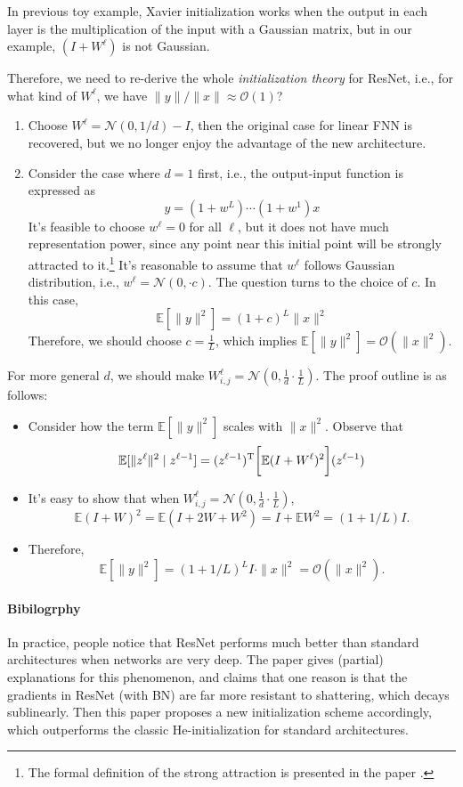 \begin{example}
\begin{enumerate}
In previous toy example, Xavier initialization works when the output in each layer is the multiplication of the input with a Gaussian matrix, but in our example, 
$(I+W^{\ell})$ is not Gaussian.
\end{enumerate}
Therefore, we need to re-derive the whole \emph{initialization theory} for ResNet, i.e., 
for what kind of $W^{\ell}$, we have $\|y\|/\|x\|\approx\mathcal{O}(1)$?
\begin{enumerate}
\item
Choose $W^{\ell}=\mathcal{N}(0,1/d)-I$, then the original case for linear FNN is recovered, but
we no longer enjoy the advantage of the new architecture.
\item
Consider the case where $d=1$ first, i.e., the output-input function is expressed as
\[
y =(1+w^L)\cdots(1+w^1)x
\]
It's feasible to choose $w^{\ell}=0$ for all $\ell$, but it does not have much representation power, since any point near this initial point will be strongly attracted to it.\footnote{
The formal definition of the strong attraction is presented in the paper \citep{Zhang2000}.
}
It's reasonable to assume that $w^{\ell}$ follows Gaussian distribution, i.e., 
$w^{\ell} = \mathcal{N}(0,\cdot c)$. The question turns to the choice of $c$.
In this case, 
\[
\mathbb{E}[\|y\|^2] = (1+c)^L\|x\|^2
\]
Therefore, we should choose $c=\frac{1}{L}$, which implies $\mathbb{E}[\|y\|^2]=\mathcal{O}(\|x\|^2)$.
\end{enumerate}
For more general $d$, we should make $W^{\ell}_{i,j}=\mathcal{N}(0,\frac{1}{d}\cdot\frac{1}{L})$. The proof outline is as follows:
\begin{itemize}
\item
Consider how the term $\mathbb{E}[\|y\|^2]$ scales with $\|x\|^2$.
Observe that
\begin{align*}
\mathbb{E}[\|z^{\ell}\|^2\mid z^{\ell-1}] = (z^{\ell-1})^{\mathrm T}\bigg[\mathbb{E}(I+W^{\ell})^2\bigg](z^{\ell-1})
\end{align*}
\item
It's easy to show that when $W^{\ell}_{i,j}=\mathcal{N}(0,\frac{1}{d}\cdot\frac{1}{L})$,
\[
\mathbb{E}(I+W)^2 = \mathbb{E}(I+2W+W^2)=I+\mathbb{E}W^2=(1+1/L)I.
\]
\item
Therefore,
\[
\mathbb{E}[\|y\|^2] = (1+1/L)^LI\cdot\|x\|^2=\mathcal{O}(\|x\|^2).
\]
\end{itemize}
\end{example}
\paragraph{Bibilogrphy}
In practice, people notice that ResNet performs much better than standard architectures
when networks are very deep. The paper \citep{Balduzzi2017} gives (partial) explanations for this phenomenon, and claims that one reason is that the gradients in ResNet (with BN) are far more resistant to shattering, which decays sublinearly.
Then this paper proposes a new initialization scheme accordingly, which outperforms the classic He-initialization for standard architectures.

